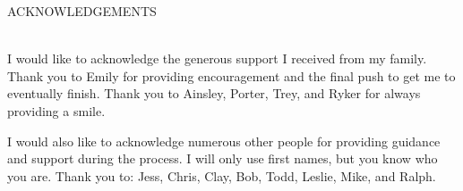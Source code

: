 \documentclass[SDSUThesis.tex]{subfiles}
\begin{document}
\newpage

\begin{center}
ACKNOWLEDGEMENTS\\
~\\
\end{center}

I would like to acknowledge the generous support I received from my family. Thank you
to Emily for providing encouragement and the final push to get me to eventually finish.
Thank you to Ainsley, Porter, Trey, and Ryker for always providing a smile.

I would also like to acknowledge numerous other people for providing
guidance and support during the process.
I will only use first names, but you know who you are. Thank you to: Jess, Chris, Clay, 
Bob, Todd, Leslie, Mike, and Ralph.
\end{document}
